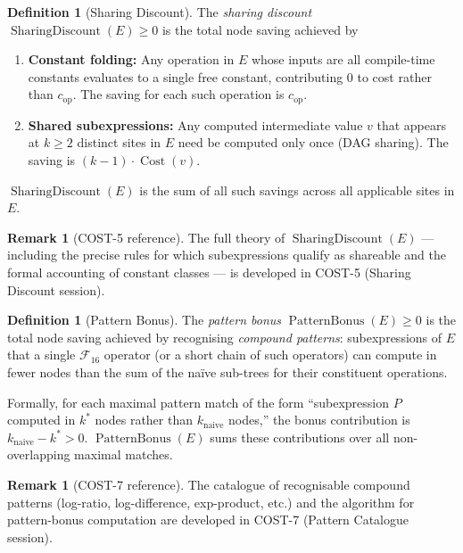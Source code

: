 \documentclass[12pt,a4paper]{article}
\theoremstyle{definition}
\newtheorem{definition}[theorem]{Definition}
\newtheorem{remark}[theorem]{Remark}
\newcommand{\Cost}{\operatorname{Cost}}
\newcommand{\SD}{\operatorname{SharingDiscount}}
\newcommand{\PB}{\operatorname{PatternBonus}}
\begin{document}
\begin{definition}[Sharing Discount]
\label{def:SD}
The \emph{sharing discount} $\SD(E) \geq 0$ is the total node saving
achieved by
\begin{enumerate}
  \item \textbf{Constant folding:} Any operation in $E$ whose inputs are
        all compile-time constants evaluates to a single free constant,
        contributing 0 to cost rather than $c_{\mathrm{op}}$.  The saving
        for each such operation is $c_{\mathrm{op}}$.
  \item \textbf{Shared subexpressions:} Any computed intermediate value
        $v$ that appears at $k \geq 2$ distinct sites in $E$ need be
        computed only once (DAG sharing).  The saving is
        $(k-1) \cdot \Cost(v)$.
\end{enumerate}
$\SD(E)$ is the sum of all such savings across all applicable sites in $E$.
\end{definition}

\begin{remark}[COST-5 reference]
The full theory of $\SD(E)$ --- including the precise rules for which
subexpressions qualify as shareable and the formal accounting of constant
classes --- is developed in COST-5 (Sharing Discount session).
\end{remark}

\begin{definition}[Pattern Bonus]
\label{def:PB}
The \emph{pattern bonus} $\PB(E) \geq 0$ is the total node saving
achieved by recognising \emph{compound patterns}: subexpressions of $E$
that a single $\mathcal{F}_{16}$ operator (or a short chain of such
operators) can compute in fewer nodes than the sum of the na\"{i}ve
sub-trees for their constituent operations.

Formally, for each maximal pattern match of the form
``subexpression $P$ computed in $k^*$ nodes rather than $k_{\mathrm{naive}}$
nodes,'' the bonus contribution is $k_{\mathrm{naive}} - k^* > 0$.
$\PB(E)$ sums these contributions over all non-overlapping maximal matches.
\end{definition}

\begin{remark}[COST-7 reference]
The catalogue of recognisable compound patterns (log-ratio, log-difference,
exp-product, etc.) and the algorithm for pattern-bonus computation are
developed in COST-7 (Pattern Catalogue session).
\end{remark}
\end{document}
